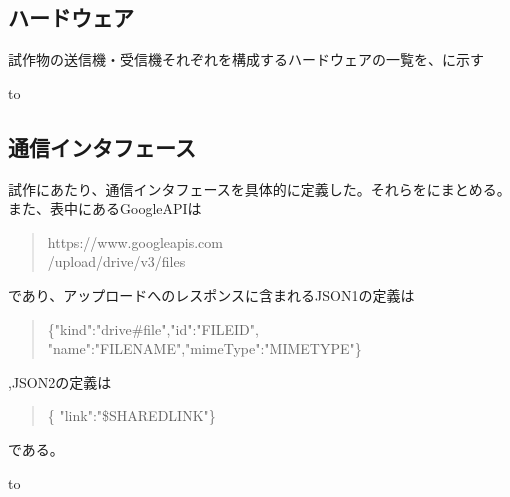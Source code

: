 \documentclass[submit,techrep,noauthor]{ipsj}
\begin{document}
\subsection{ハードウェア}
試作物の送信機・受信機それぞれを構成するハードウェアの一覧を、に示す

\begin{table}[tb] 
\caption{試作物のハードウェア一覧} 
\label{tab:proto-hardwares}
\hbox to
\end{table}

\subsection{通信インタフェース}
試作にあたり、通信インタフェースを具体的に定義した。それらをにまとめる。また、表中にあるGoogleAPIは
\begin{quote}
    https://www.googleapis.com\\/upload/drive/v3/files
\end{quote}であり、アップロードへのレスポンスに含まれるJSON1の定義は\begin{quote}
    \{"kind":"drive\#file","id":"FILEID", "name":"FILENAME","mimeType":"MIMETYPE"\}
\end{quote},JSON2の定義は\begin{quote}
    \{ "link":"\$SHAREDLINK"\}
\end{quote}である。

\begin{table}[tb] 
\caption{試作物の通信インタフェース} 
\label{tab:proto-communication}
\hbox to
\end{table}
\end{document}
